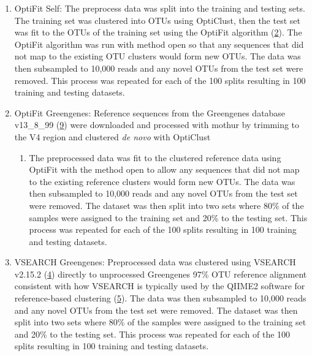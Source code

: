 \documentclass[
]{article}
\providecommand{\tightlist}{%
  \setlength{\itemsep}{0pt}\setlength{\parskip}{0pt}}
\begin{document}
\begin{enumerate}
\def\labelenumi{\arabic{enumi}.}
\tightlist
\item
  OptiFit Self: The preprocess data was split into the training and
  testing sets. The training set was clustered into OTUs using
  OptiClust, then the test set was fit to the OTUs of the training set
  using the OptiFit algorithm (\protect\hyperlink{ref-sovacool2022}{2}).
  The OptiFit algorithm was run with method open so that any sequences
  that did not map to the existing OTU clusters would form new OTUs. The
  data was then subsampled to 10,000 reads and any novel OTUs from the
  test set were removed. This process was repeated for each of the 100
  splits resulting in 100 training and testing datasets.
\item
  OptiFit Greengenes: Reference sequences from the Greengenes database
  v13\_8\_99 (\protect\hyperlink{ref-desantis2006}{9}) were downloaded
  and processed with mothur by trimming to the V4 region and clustered
  \emph{de novo} with OptiClust

  \begin{enumerate}
  \def\labelenumii{\arabic{enumii}.}
  \tightlist
  \item
    The preprocessed data was fit to the clustered reference data using
    OptiFit with the method open to allow any sequences that did not map
    to the existing reference clusters would form new OTUs. The data was
    then subsampled to 10,000 reads and any novel OTUs from the test set
    were removed. The dataset was then split into two sets where 80\% of
    the samples were assigned to the training set and 20\% to the
    testing set. This process was repeated for each of the 100 splits
    resulting in 100 training and testing datasets.
  \end{enumerate}
\item
  VSEARCH Greengenes: Preprocessed data was clustered using VSEARCH
  v2.15.2 (\protect\hyperlink{ref-rognes2016}{4}) directly to
  unprocessed Greengenes 97\% OTU reference alignment consistent with
  how VSEARCH is typically used by the QIIME2 software for
  reference-based clustering (\protect\hyperlink{ref-bolyen2019}{5}).
  The data was then subsampled to 10,000 reads and any novel OTUs from
  the test set were removed. The dataset was then split into two sets
  where 80\% of the samples were assigned to the training set and 20\%
  to the testing set. This process was repeated for each of the 100
  splits resulting in 100 training and testing datasets.
\end{enumerate}
\end{document}
